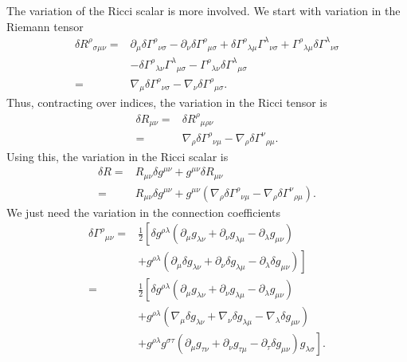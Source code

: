 \documentclass[a4paper, 11pt, titlepage, twoside]{report}
\begin{document}
The variation of the Ricci scalar is more involved. We start with variation in the Riemann tensor
\begin{align}
\delta {R^\rho}_{\sigma\mu\nu} = {} & \partial_\mu\delta{\Gamma^\rho}_{\nu\sigma} - \partial_\nu\delta{\Gamma^\rho}_{\mu\sigma} + \delta{\Gamma^\rho}_{\lambda\mu}{\Gamma^\lambda}_{\nu\sigma} + {\Gamma^\rho}_{\lambda\mu}\delta{\Gamma^\lambda}_{\nu\sigma}\nonumber \\
 & - \delta{\Gamma^\rho}_{\lambda\nu}{\Gamma^\lambda}_{\mu\sigma} - {\Gamma^\rho}_{\lambda\nu}\delta{\Gamma^\lambda}_{\mu\sigma}\nonumber \\
 = {} & \nabla_\mu\delta{\Gamma^\rho}_{\nu\sigma} - \nabla_\nu\delta{\Gamma^\rho}_{\mu\sigma}.
\end{align}
Thus, contracting over indices, the variation in the Ricci tensor is
\begin{align}
\delta R_{\mu\nu} = {} & \delta {R^\rho}_{\mu\rho\nu} \nonumber \\
 = {} & \nabla_\rho\delta{\Gamma^\rho}_{\nu\mu} - \nabla_\rho\delta{\Gamma^\nu}_{\rho\mu}.
\end{align}
Using this, the variation in the Ricci scalar is
\begin{align}
\delta R = {} & R_{\mu\nu}\delta g^{\mu\nu} + g^{\mu\nu}\delta R_{\mu\nu} \nonumber \\
 = {} & R_{\mu\nu}\delta g^{\mu\nu} + g^{\mu\nu}\left(\nabla_\rho\delta{\Gamma^\rho}_{\nu\mu} - \nabla_\rho\delta{\Gamma^\nu}_{\rho\mu}\right).
\end{align}
We just need the variation in the connection coefficients
\begin{align}
\delta {\Gamma^\rho}_{\mu\nu} = {} & \frac{1}{2}\left[\delta g^{\rho\lambda}(\partial_\mu g_{\lambda\nu} + \partial_\nu g_{\lambda\mu} - \partial_\lambda g_{\mu\nu})\right.\nonumber \\
 & + \left. g^{\rho\lambda}(\partial_\mu \delta g_{\lambda\nu} + \partial_\nu \delta g_{\lambda\mu} - \partial_\lambda \delta g_{\mu\nu})\right]\nonumber \\
 = {} & \frac{1}{2}\left[\delta g^{\rho\lambda}(\partial_\mu g_{\lambda\nu} + \partial_\nu g_{\lambda\mu} - \partial_\lambda g_{\mu\nu})\right.\nonumber \\
 & + \left. g^{\rho\lambda}(\nabla_\mu \delta g_{\lambda\nu} + \nabla_\nu \delta g_{\lambda\mu} - \nabla_\lambda \delta g_{\mu\nu})\right. \nonumber \\
 & + \left. g^{\rho\lambda}g^{\sigma\tau}(\partial_\mu g_{\tau\nu} + \partial_\nu g_{\tau\mu} - \partial_\tau \delta g_{\mu\nu})g_{\lambda\sigma}\right].
\end{align}
\end{document}
